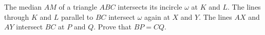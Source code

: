 The median $AM$ of a triangle $ABC$ intersects its incircle $\omega$ at $K$ and $L$. The lines through $K$ and $L$ parallel to $BC$ intersect $\omega$ again at $X$ and $Y$. The lines $AX$ and $AY$ intersect $BC$ at $P$ and $Q$. Prove that $BP = CQ$.
